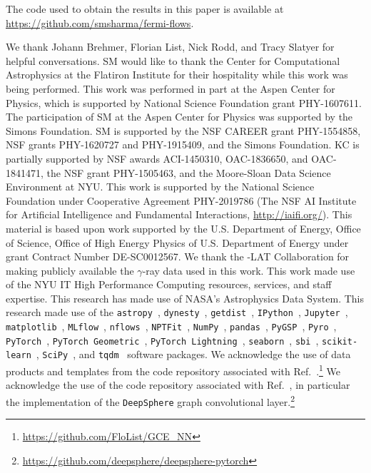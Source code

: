 \documentclass[prd,aps,10pt,nofootinbib,twocolumn,superscriptaddress,preprintnumbers,balancelastpage,longbibliography]{revtex4-1}
\begin{document}
The code used to obtain the results in this paper is available at \url{https://github.com/smsharma/fermi-flows}.


\vspace{.2cm}

\begin{acknowledgments}

We thank Johann Brehmer, Florian List, Nick Rodd, and Tracy Slatyer for helpful conversations. 
SM would like to thank the Center for Computational Astrophysics at the Flatiron Institute for their hospitality while this work was being performed. 
This work was performed in part at the Aspen Center for Physics, which is supported by National Science Foundation grant PHY-1607611.
The participation of SM at the Aspen Center for Physics was supported by the Simons Foundation.
SM is supported by the NSF CAREER grant PHY-1554858, NSF grants PHY-1620727 and PHY-1915409, and the Simons Foundation. 
KC is partially supported by NSF awards ACI-1450310, OAC-1836650, and OAC-1841471, the NSF grant PHY-1505463, and the Moore-Sloan Data Science Environment at NYU. 
This work is supported by the National Science Foundation under Cooperative Agreement PHY-2019786 (The NSF AI Institute for Artificial Intelligence and Fundamental Interactions, \url{http://iaifi.org/}).
This material is based upon work supported by the U.S. Department of Energy, Office of Science, Office of High Energy Physics of U.S. Department of Energy under grant Contract Number DE-SC0012567.
We thank the \Fermi-LAT Collaboration for making publicly available the $\gamma$-ray data used in this work.
This work made use of the NYU IT High Performance Computing resources, services, and staff expertise. 
This research has made use of NASA's Astrophysics Data System. 
This research made use of the \texttt{astropy}~\cite{Price-Whelan:2018hus,Robitaille:2013mpa}, \texttt{dynesty}~\cite{Speagle_2020}, \texttt{getdist}~\cite{Lewis:2019xzd}, \texttt{IPython}~\cite{PER-GRA:2007}, \texttt{Jupyter}~\cite{Kluyver2016JupyterN}, \texttt{matplotlib}~\cite{Hunter:2007}, \texttt{MLflow}~\cite{chen2020developments}, \texttt{nflows}~\cite{nflows}, \texttt{NPTFit}~\cite{Mishra-Sharma:2016gis}, \texttt{NumPy}~\cite{harris2020array}, \texttt{pandas}~\cite{pandas:2010}, \texttt{PyGSP}~\cite{michael_defferrard_2017_1003158}, \texttt{Pyro}~\cite{bingham2018pyro}, \texttt{PyTorch}~\cite{NEURIPS2019_9015}, \texttt{PyTorch Geometric}~\cite{Fey/Lenssen/2019}, \texttt{PyTorch Lightning}~\cite{william_falcon_2020_3828935}, \texttt{seaborn}~\cite{seaborn}, \texttt{sbi}~\cite{tejero-cantero2020sbi}, \texttt{scikit-learn}~\cite{scikit-learn}, \texttt{SciPy}~\cite{2020SciPy-NMeth}, and \texttt{tqdm}~\cite{da2019tqdm} software packages. We acknowledge the use of data products and templates from the code repository associated with Ref.~\cite{List:2020mzd}.\footnote{\url{https://github.com/FloList/GCE_NN}} 
We acknowledge the use of the code repository associated with Ref.~\cite{defferrard2020deepsphere}, in particular the implementation of the \texttt{DeepSphere} graph convolutional layer.\footnote{\url{https://github.com/deepsphere/deepsphere-pytorch}}
\end{acknowledgments}
\end{document}
